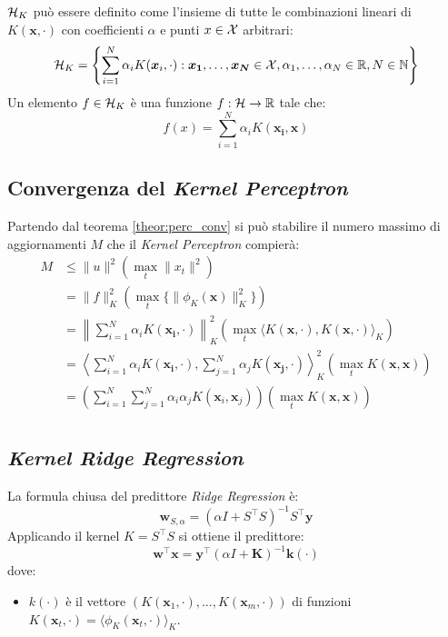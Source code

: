 $\mathcal{H}_K$ può essere definito come l'insieme di tutte le combinazioni
lineari di $K(\bm{x},\cdot)$ con coefficienti $\alpha$ e punti $x\in\mathcal{X}$
arbitrari:
$$ \mathcal{H}_K = \left\{
    \sum_{i=1}^{N}\alpha_i K(\bm{x}_i,\cdot):\bm{x_1},\dots,\bm{x_N}\in\mathcal{X}
    , \alpha_1,\dots,\alpha_N \in \mathbb{R}, N\in\mathbb{N}
\right\} $$
Un elemento $f\in\mathcal{H}_K$ è una funzione $f:\mathcal{H}\rightarrow\mathbb{R}$ tale
che:
$$ f(x)=\sum_{i=1}^{N} \alpha_i K(\bm{x_i},\bm{x}) $$

\subsection{Convergenza del \textit{Kernel Perceptron}}
Partendo dal teorema \ref{theor:perc_conv} si può stabilire il numero
massimo di aggiornamenti $M$ che il \textit{Kernel Perceptron} compierà:
$$
\begin{aligned}
    M &\leq \|u\|^2\left(\max_t\|x_t\|^2\right)\\
    &= \|f\|^2_K\left(\max_t\{\|\phi_K(\bm{x})\|^2_K\}\right)\\
    &= \left\|\sum_{i=1}^{N} \alpha_i K(\bm{x_i},\cdot)\right\|^2_K
        \left(\max_t\langle K(\bm{x},\cdot),K(\bm{x},\cdot)\rangle_K\right)\\
    &= \left\langle \sum_{i=1}^{N} \alpha_i K(\bm{x_i},\cdot),
    \sum_{j=1}^{N} \alpha_j K(\bm{x_j},\cdot) \right\rangle^2_K
        \left(\max_t K(\bm{x},\bm{x}) \right)\\
    &=  \left(\sum_{i=1}^{N}\sum_{j=1}^{N} \alpha_i\alpha_j K(\bm{x}_i,\bm{x}_j)\right)
        \left(\max_t K(\bm{x},\bm{x}) \right)\\
\end{aligned}
$$

\subsection{\textit{Kernel Ridge Regression}}
La formula chiusa del predittore \textit{Ridge Regression} è:
$$ \bm{w}_{S,\alpha} = (\alpha I +S^\top S)^{-1}S^\top \bm{y} $$
Applicando il kernel $K=S^\top S$ si ottiene il predittore:
$$ \bm{w}^\top\bm{x} = \bm{y}^\top(\alpha I+\bm{K})^{-1}\bm{k}(\cdot) $$
dove:
\begin{itemize}
    \item $k(\cdot)$ è il vettore $(K(\bm{x}_1,\cdot),\dots,K(\bm{x}_m,\cdot))$
        di funzioni $K(\bm{x}_t,\cdot)=\langle\phi_K(\bm{x}_t,\cdot)\rangle_K$.
\end{itemize}